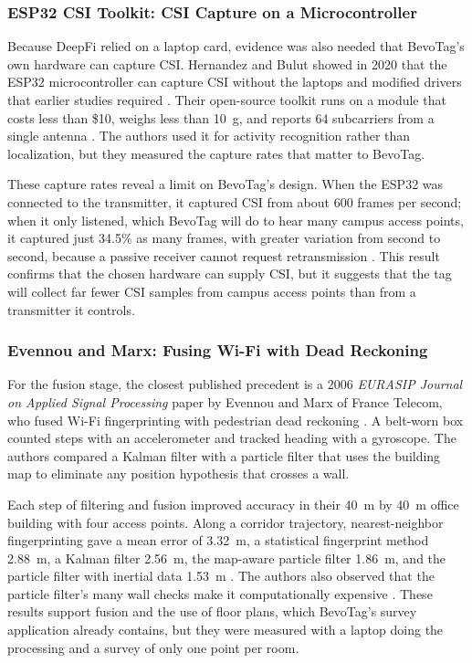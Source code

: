 \documentclass[12pt,letterpaper]{article}
\begin{document}
\subsubsection{ESP32 CSI Toolkit: CSI Capture on a Microcontroller}
Because DeepFi relied on a laptop card, evidence was also needed that BevoTag's own hardware can
capture CSI. Hernandez and Bulut showed in 2020 that the ESP32 microcontroller can capture CSI
without the laptops and modified drivers that earlier studies required \cite{esp32tool}. Their
open-source toolkit runs on a module that costs less than \$10, weighs less than 10~g, and reports
64 subcarriers from a single antenna \cite{esp32tool}. The authors used it for activity
recognition rather than localization, but they measured the capture rates that matter to BevoTag.

These capture rates reveal a limit on BevoTag's design. When the ESP32 was connected to the
transmitter, it captured CSI from about 600 frames per second; when it only listened, which BevoTag
will do to hear many campus access points, it captured just 34.5\% as many frames, with greater
variation from second to second, because a passive receiver cannot request retransmission
\cite{esp32tool}. This result confirms that the chosen hardware can supply CSI, but it suggests
that the tag will collect far fewer CSI samples from campus access points than from a transmitter
it controls.

\subsubsection{Evennou and Marx: Fusing Wi-Fi with Dead Reckoning}
For the fusion stage, the closest published precedent is a 2006 \emph{EURASIP Journal on Applied
Signal Processing} paper by Evennou and Marx of France Telecom, who fused Wi-Fi fingerprinting with
pedestrian dead reckoning \cite{evennou}. A belt-worn box counted steps with an accelerometer and
tracked heading with a gyroscope. The authors compared a Kalman filter with a particle filter that
uses the building map to eliminate any position hypothesis that crosses a wall.

Each step of filtering and fusion improved accuracy in their 40~m by 40~m office building with
four access points. Along a corridor trajectory, nearest-neighbor fingerprinting gave a mean error
of 3.32~m, a statistical fingerprint method 2.88~m, a Kalman filter 2.56~m, the map-aware particle
filter 1.86~m, and the particle filter with inertial data 1.53~m \cite{evennou}. The authors also
observed that the particle filter's many wall checks make it computationally expensive
\cite{evennou}. These results support fusion and the use of floor plans, which BevoTag's survey
application already contains, but they were measured with a laptop doing the processing and a
survey of only one point per room.
\end{document}
